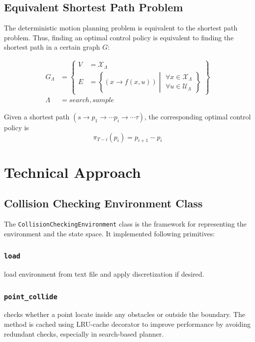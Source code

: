\documentclass[conference]{IEEEtran}
\begin{document}
\subsection{Equivalent Shortest Path Problem}
The deterministic motion planning problem is equivalent to the shortest path problem. 
Thus, finding an optimal control policy is equivalent to 
finding the shortest path in a certain graph $G$:

\[
\begin{aligned}
G_{\Lambda} &= \left\{
\begin{aligned}
    V &= \mathcal{X}_{\Lambda} \\ 
    E &= \left\{ (x \rightarrow f(x,u)) \middle| 
        \begin{gathered}
            \forall x \in \mathcal{X}_{\Lambda} \\
            \forall u \in \mathcal{U}_{\Lambda} 
        \end{gathered}
        \right\} 
\end{aligned}
\right\} \\
\Lambda &= search, sample
\end{aligned}
\]

Given a shortest path $(s \rightarrow p_1 \rightarrow \cdots p_i \rightarrow \cdots\tau)$,
the corresponding optimal control policy is 
$$\pi_{T-i}(p_i) = p_{i+1} - p_{i}$$


\section{Technical Approach}

\subsection{Collision Checking Environment Class}
The \texttt{CollisionCheckingEnvironment} class is 
the framework for representing the environment and the state space.
It implemented following primitives:

\subsubsection{\texttt{load}}
load environment from text file and apply discretization if desired.

\subsubsection{\texttt{point\_collide}}
checks whether a point locate inside any obstacles or outside the boundary.
The method is cached using LRU-cache decorator to improve performance by avoiding redundant checks,
especially in search-based planner.
\end{document}
